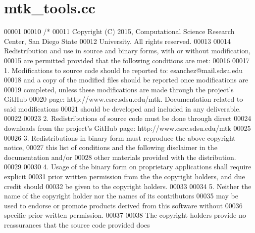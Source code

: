\hypertarget{mtk__tools_8cc_source}{\section{mtk\+\_\+tools.\+cc}
\label{mtk__tools_8cc_source}
}

\begin{DoxyCode}
00001 
00010 \textcolor{comment}{/*}
00011 \textcolor{comment}{Copyright (C) 2015, Computational Science Research Center, San Diego State}
00012 \textcolor{comment}{University. All rights reserved.}
00013 \textcolor{comment}{}
00014 \textcolor{comment}{Redistribution and use in source and binary forms, with or without modification,}
00015 \textcolor{comment}{are permitted provided that the following conditions are met:}
00016 \textcolor{comment}{}
00017 \textcolor{comment}{1. Modifications to source code should be reported to: esanchez@mail.sdsu.edu}
00018 \textcolor{comment}{and a copy of the modified files should be reported once modifications are}
00019 \textcolor{comment}{completed, unless these modifications are made through the project's GitHub}
00020 \textcolor{comment}{page: http://www.csrc.sdsu.edu/mtk. Documentation related to said modifications}
00021 \textcolor{comment}{should be developed and included in any deliverable.}
00022 \textcolor{comment}{}
00023 \textcolor{comment}{2. Redistributions of source code must be done through direct}
00024 \textcolor{comment}{downloads from the project's GitHub page: http://www.csrc.sdsu.edu/mtk}
00025 \textcolor{comment}{}
00026 \textcolor{comment}{3. Redistributions in binary form must reproduce the above copyright notice,}
00027 \textcolor{comment}{this list of conditions and the following disclaimer in the documentation and/or}
00028 \textcolor{comment}{other materials provided with the distribution.}
00029 \textcolor{comment}{}
00030 \textcolor{comment}{4. Usage of the binary form on proprietary applications shall require explicit}
00031 \textcolor{comment}{prior written permission from the the copyright holders, and due credit should}
00032 \textcolor{comment}{be given to the copyright holders.}
00033 \textcolor{comment}{}
00034 \textcolor{comment}{5. Neither the name of the copyright holder nor the names of its contributors}
00035 \textcolor{comment}{may be used to endorse or promote products derived from this software without}
00036 \textcolor{comment}{specific prior written permission.}
00037 \textcolor{comment}{}
00038 \textcolor{comment}{The copyright holders provide no reassurances that the source code provided does}

\end{DoxyCode}
